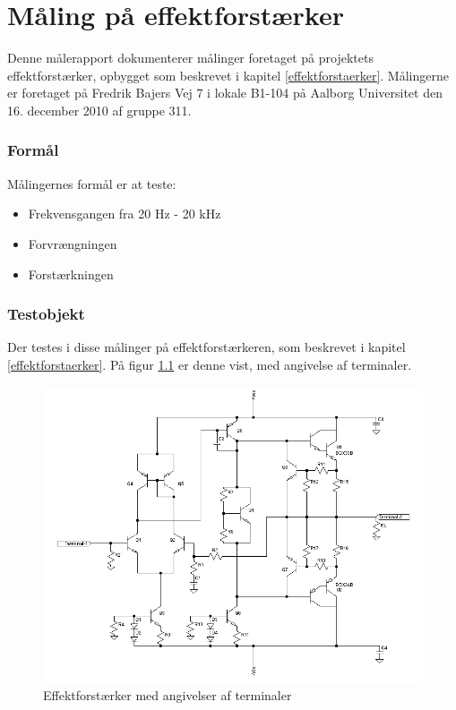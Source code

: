 \chapter{Måling på effektforstærker}
\label{maalejournal}

Denne målerapport dokumenterer målinger foretaget på projektets effektforstærker, opbygget som beskrevet i kapitel \ref{effektforstaerker}. Målingerne er foretaget på Fredrik Bajers Vej 7 i lokale B1-104 på Aalborg Universitet den 16. december 2010 af gruppe 311.

\subsection*{Formål}

Målingernes formål er at teste:
\begin{itemize}
\item Frekvensgangen fra 20 Hz - 20 kHz
\item Forvrængningen
\item Forstærkningen
\end{itemize}

\subsection*{Testobjekt}
Der testes i disse målinger på effektforstærkeren, som beskrevet i kapitel \ref{effektforstaerker}. På figur \ref{fig:testob_efforstaerker} er denne vist, med angivelse af terminaler.

\begin{figure}[h]
\centering
\includegraphics[width=\textwidth]{maalerapporter/effektforstaerker/effektforstaerker_maelerapport.png}
\caption{Effektforstærker med angivelser af terminaler}
\label{fig:testob_efforstaerker}
\end{figure}

